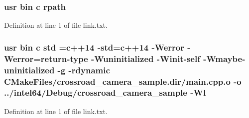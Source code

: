 \subsubsection[{\texorpdfstring{rpath}{rpath}}]{\setlength{\rightskip}{0pt plus 5cm}usr bin {\bf c} rpath}\hypertarget{crossroad__camera__sample_2CMakeFiles_2crossroad__camera__sample_8dir_2link_8txt_ab9d7fd7120fafa2118a4e08c1df697c7}{}\label{crossroad__camera__sample_2CMakeFiles_2crossroad__camera__sample_8dir_2link_8txt_ab9d7fd7120fafa2118a4e08c1df697c7}


Definition at line 1 of file link.\+txt.

\subsubsection[{\texorpdfstring{std}{std}}]{\setlength{\rightskip}{0pt plus 5cm}usr bin {\bf c} std ={\bf c}++14 -\/std={\bf c}++14 -\/Werror -\/Werror=return-\/type -\/Wuninitialized -\/Winit-\/self -\/Wmaybe-\/uninitialized -\/g -\/rdynamic C\+Make\+Files/crossroad\+\_\+camera\+\_\+sample.\+dir/main.\+cpp.\+o -\/o ../intel64/Debug/crossroad\+\_\+camera\+\_\+sample -\/{\bf Wl}}\hypertarget{crossroad__camera__sample_2CMakeFiles_2crossroad__camera__sample_8dir_2link_8txt_a1ccfea5f558575a112db71eeb271fabf}{}\label{crossroad__camera__sample_2CMakeFiles_2crossroad__camera__sample_8dir_2link_8txt_a1ccfea5f558575a112db71eeb271fabf}


Definition at line 1 of file link.\+txt.

